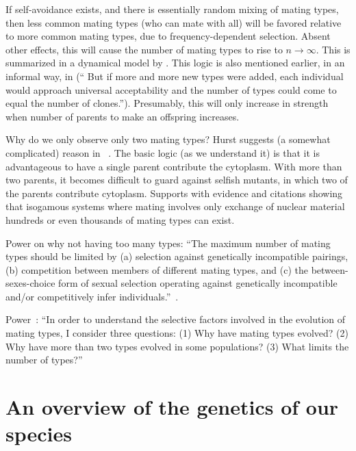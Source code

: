 \documentclass{report}
\begin{document}
\begin{enumerate}


If self-avoidance exists, and there is essentially random mixing of mating types, then less common mating types (who can mate with all) will be favored relative to more common mating types,  due to frequency-dependent selection. Absent other effects, this will cause the number of mating types to rise to $n\to \infty$.  This is summarized in a dynamical model by \cite{iwasa_evolution_1987}. This logic is also mentioned earlier, in an informal way, in \cite{power_forces_1976} (`` But if more and more new types were added, each individual would approach universal acceptability and the number of types could come to equal the number of clones.''). Presumably, this will only increase in strength when number of parents to make an offspring increases.

Why do we only observe only two mating types?  Hurst suggests (a somewhat complicated) reason in ~\cite{hurst_why_1996}.  The basic logic (as we understand it) is that it is advantageous to have a single parent contribute the cytoplasm.  With more than two parents, it becomes difficult to guard against selfish mutants, in which two of the parents contribute cytoplasm.  Supports with evidence and citations showing that isogamous systems where mating involves only exchange of nuclear material hundreds or even thousands of mating types can exist.

Power on why not having too many types: ``The maximum number of mating types should be limited by (a) selection against genetically incompatible pairings, (b) competition between members of different mating types, and (c) the between-sexes-choice form of sexual selection operating against genetically incompatible and/or competitively infer individuals.''~\cite{power_forces_1976}.

Power~\cite{power_forces_1976}: ``In order to understand the selective factors involved in the evolution of mating types, I consider three questions: (1) Why have mating types evolved? (2) Why have more than two types evolved in some populations? (3) What limits the number of types?''

\end{enumerate}

\section*{An overview of the genetics of our species} 
\end{document}
